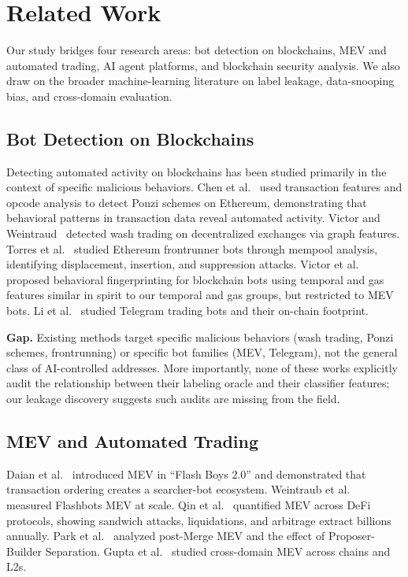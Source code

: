 \documentclass[sigconf,nonacm=false]{acmart}
\begin{document}
\section{Related Work}

Our study bridges four research areas: bot detection on blockchains, MEV and automated trading, AI agent platforms, and blockchain security analysis. We also draw on the broader machine-learning literature on label leakage, data-snooping bias, and cross-domain evaluation.

\subsection{Bot Detection on Blockchains}

Detecting automated activity on blockchains has been studied primarily in the context of specific malicious behaviors. Chen et al.~\cite{chen2018ponzi} used transaction features and opcode analysis to detect Ponzi schemes on Ethereum, demonstrating that behavioral patterns in transaction data reveal automated activity. Victor and Weintraud~\cite{victor2021wash} detected wash trading on decentralized exchanges via graph features. Torres et al.~\cite{torres2021frontrunner} studied Ethereum frontrunner bots through mempool analysis, identifying displacement, insertion, and suppression attacks. Victor et al.~\cite{victor2023fingerprinting} proposed behavioral fingerprinting for blockchain bots using temporal and gas features similar in spirit to our temporal and gas groups, but restricted to MEV bots. Li et al.~\cite{li2024telegram} studied Telegram trading bots and their on-chain footprint.

\textbf{Gap.} Existing methods target specific malicious behaviors (wash trading, Ponzi schemes, frontrunning) or specific bot families (MEV, Telegram), not the general class of AI-controlled addresses. More importantly, none of these works explicitly audit the relationship between their labeling oracle and their classifier features; our leakage discovery suggests such audits are missing from the field.

\subsection{MEV and Automated Trading}

Daian et al.~\cite{daian2020flash} introduced MEV in ``Flash Boys 2.0'' and demonstrated that transaction ordering creates a searcher-bot ecosystem. Weintraub et al.~\cite{weintraub2022flashbot} measured Flashbots MEV at scale. Qin et al.~\cite{qin2022quantifying} quantified MEV across DeFi protocols, showing sandwich attacks, liquidations, and arbitrage extract billions annually. Park et al.~\cite{park2024mev} analyzed post-Merge MEV and the effect of Proposer-Builder Separation. Gupta et al.~\cite{gupta2023crossdomain} studied cross-domain MEV across chains and L2s.
\end{document}
